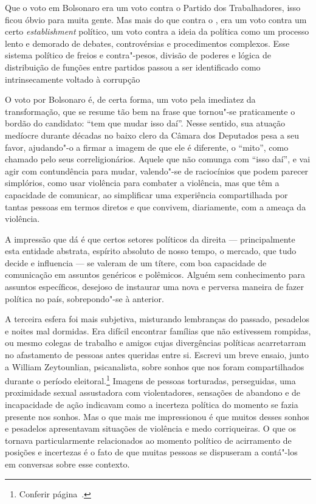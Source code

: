 Que o voto em Bolsonaro era um voto contra o Partido dos Trabalhadores,
isso ficou óbvio para muita gente.
Mas mais do que contra o , era um voto contra um
certo \emph{establishment} político, um voto contra a ideia da política
como um processo lento e demorado de debates, controvérsias e
procedimentos complexos. Esse sistema político de freios e contra"-pesos, divisão de poderes e lógica de distribuição de funções entre partidos passou a ser identificado como intrinsecamente voltado à corrupção

O voto por Bolsonaro é, de certa forma, um voto
pela imediatez da transformação, que se resume tão bem na frase que
tornou"-se praticamente o bordão do candidato: ``tem que mudar isso
daí''. Nesse sentido, sua atuação medíocre durante décadas no baixo
clero da Câmara dos Deputados pesa a seu favor, ajudando"-o a firmar a imagem de que
ele é diferente, o ``mito'', como chamado pelo seus correligionários.
Aquele que não comunga com ``isso daí'', e vai agir com contundência para
mudar, valendo"-se de raciocínios que podem parecer simplórios, como usar
violência para combater a violência, mas que têm a capacidade de
comunicar, ao simplificar uma experiência compartilhada por tantas
pessoas em termos diretos e que convivem, diariamente, com a ameaça da violência.

A impressão que dá é que certos setores
políticos da direita --- principalmente esta entidade abstrata, espírito absoluto de nosso tempo, o mercado, que tudo decide e influencia --- se valeram de um títere, com boa capacidade de
comunicação em assuntos genéricos e polêmicos. Alguém sem conhecimento
para assuntos específicos, desejoso de instaurar uma nova e perversa maneira de fazer política no país, sobrepondo"-se à anterior.

A terceira esfera foi mais subjetiva, misturando lembranças do passado,
pesadelos e noites mal dormidas. Era difícil encontrar famílias que não
estivessem rompidas, ou mesmo colegas de trabalho e amigos cujas divergências
políticas acarretarram no afastamento de pessoas antes queridas entre si.
Escrevi um breve ensaio, junto a William Zeytounlian, psicanalista, sobre sonhos
que nos foram compartilhados durante o período eleitoral.\footnote{Conferir página~\pageref{sonhos}.} Imagens de
pessoas torturadas, perseguidas, uma proximidade sexual assustadora com
violentadores, sensações de abandono e de incapacidade de ação indicavam
como a incerteza política do momento se fazia presente nos sonhos. Mas o
que mais me impressionou é que muitos desses sonhos e pesadelos
apresentavam situações de violência e medo corriqueiras. O que os
tornava particularmente relacionados ao momento político de acirramento
de posições e incertezas é o fato de que muitas pessoas se dispuseram a
contá"-los em conversas sobre esse contexto.

